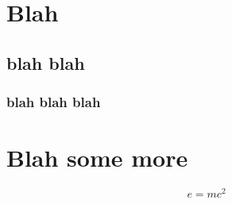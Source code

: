 \documentclass[masters,draft]{UTPAthesis}
\begin{document}
 \frontmatter

 \makepreliminarypages


 \mainmatter


\chapter{Blah}
\blindtext[5]
\section{blah blah}
\blindtext
\subsection{blah blah blah}
\blindtext

\chapter{Blah some more}
\blindtext
\begin{equation}\label{eq:einstein}
	e = mc^{2}
\end{equation}





\end{document}
